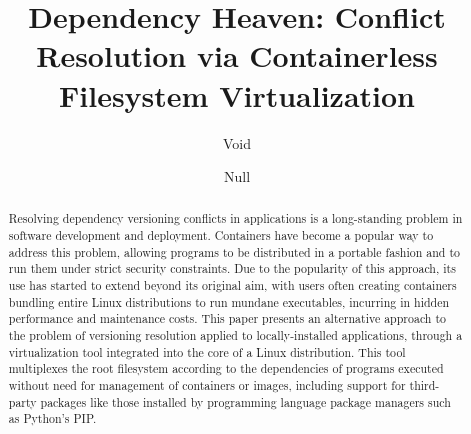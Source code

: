 \documentclass[sigplan, anonymous, 10pt]{acmart}
\begin{document}
\title[Dependency Heaven: Containerless Filesystem Virtualization]{Dependency Heaven: Conflict Resolution via Containerless Filesystem Virtualization}

\author{Void}

\author{Null}

\renewcommand{\shortauthors}{Void et al.}

\begin{abstract}
Resolving dependency versioning conflicts in applications is a long-standing problem in
software development and deployment. Containers have become a popular way to address this
problem, allowing programs to be distributed in a portable fashion and to run them under strict
security constraints. Due to the popularity of this approach, its use has started to extend
beyond its original aim, with users often creating containers bundling entire Linux distributions
to run mundane executables, incurring in hidden performance and maintenance costs.
This paper presents an alternative approach to the problem of versioning resolution applied
to locally-installed applications, through a virtualization tool integrated into the core
of a Linux distribution. This tool multiplexes the root filesystem according to the
dependencies of programs executed without need for management of containers or images,
including support for third-party packages like those installed by programming language
package managers such as Python's PIP.
\end{abstract}

\maketitle
\end{document}
